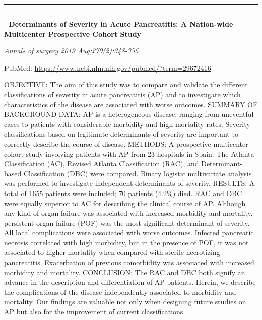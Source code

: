 \documentclass[]{article}
\begin{document}
{}

\begin{center}\rule{0.5\linewidth}{\linethickness}\end{center}

\begin{center}\rule{0.5\linewidth}{\linethickness}\end{center}

 - \textbf{Determinants of Severity in Acute Pancreatitis: A Nation-wide
Multicenter Prospective Cohort Study}

\emph{Annals of surgery 2019 Aug;270(2):348-355}

PubMed: \url{https://www.ncbi.nlm.nih.gov/pubmed/?term=29672416}

OBJECTIVE: The aim of this study was to compare and validate the
different classifications of severity in acute pancreatitis (AP) and to
investigate which characteristics of the disease are associated with
worse outcomes. SUMMARY OF BACKGROUND DATA: AP is a heterogeneous
disease, ranging from uneventful cases to patients with considerable
morbidity and high mortality rates. Severity classifications based on
legitimate determinants of severity are important to correctly describe
the course of disease. METHODS: A prospective multicenter cohort study
involving patients with AP from 23 hospitals in Spain. The Atlanta
Classification (AC), Revised Atlanta Classification (RAC), and
Determinant-based Classification (DBC) were compared. Binary logistic
multivariate analysis was performed to investigate independent
determinants of severity. RESULTS: A total of 1655 patients were
included; 70 patients (4.2\%) died. RAC and DBC were equally superior to
AC for describing the clinical course of AP. Although any kind of organ
failure was associated with increased morbidity and mortality,
persistent organ failure (POF) was the most significant determinant of
severity. All local complications were associated with worse outcomes.
Infected pancreatic necrosis correlated with high morbidity, but in the
presence of POF, it was not associated to higher mortality when compared
with sterile necrotizing pancreatitis. Exacerbation of previous
comorbidity was associated with increased morbidity and mortality.
CONCLUSION: The RAC and DBC both signify an advance in the description
and differentiation of AP patients. Herein, we describe the
complications of the disease independently associated to morbidity and
mortality. Our findings are valuable not only when designing future
studies on AP but also for the improvement of current classifications.
\end{document}
